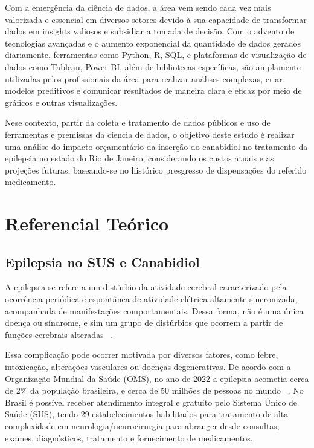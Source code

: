 \documentclass[article,a4paper,12pt,brazil,sumario=tradicional]{abntex2}
\begin{document}
Com a emergência da ciência de dados, a área vem sendo cada vez mais valorizada e essencial em diversos setores devido à sua capacidade de transformar dados em insights valiosos e subsidiar a tomada de decisão. Com o advento de tecnologias avançadas e o aumento exponencial da quantidade de dados gerados diariamente, ferramentas como Python, R, SQL, e plataformas de visualização de dados como Tableau, Power BI, além de bibliotecas específicas, são amplamente utilizadas pelos profissionais da área para realizar análises complexas, criar modelos preditivos e comunicar resultados de maneira clara e eficaz por meio de gráficos e outras visualizações.

Nese contexto, partir da coleta e tratamento de dados públicos e uso de ferramentas e premissas da ciencia de dados, o objetivo deste estudo é realizar uma análise do impacto orçamentário da inserção do canabidiol no tratamento da epilepsia no estado do Rio de Janeiro, considerando os custos atuais e as projeções futuras, baseando-se no histórico presgresso de dispensações do referido medicamento.

\section{Referencial Teórico}

\subsection{Epilepsia no SUS e Canabidiol}
A epilepsia se refere a um distúrbio da atividade cerebral caracterizado pela ocorrência periódica e espontânea de atividade elétrica altamente sincronizada, acompanhada de manifestações comportamentais. Dessa forma, não é uma única doença ou síndrome, e sim um grupo de distúrbios que ocorrem a partir de funções cerebrais alteradas ~\cite{scorza_albuquerque_arida_cavalheiro_2007}.

Essa complicação pode ocorrer motivada por diversos fatores, como febre, intoxicação, alterações vasculares ou doenças degenerativas. De acordo com a Organização Mundial da Saúde (OMS), no ano de 2022 a epilepsia acometia cerca de 2\% da população brasileira, e cerca de 50 milhões de pessoas no mundo ~\cite{epilepsia2022OMS}. No Brasil é possível receber atendimento integral e gratuito pelo Sistema Único de Saúde (SUS), tendo 29 estabelecimentos habilitados para tratamento de alta complexidade em neurologia/neurocirurgia para abranger desde consultas, exames, diagnósticos, tratamento e fornecimento de medicamentos.
\end{document}
